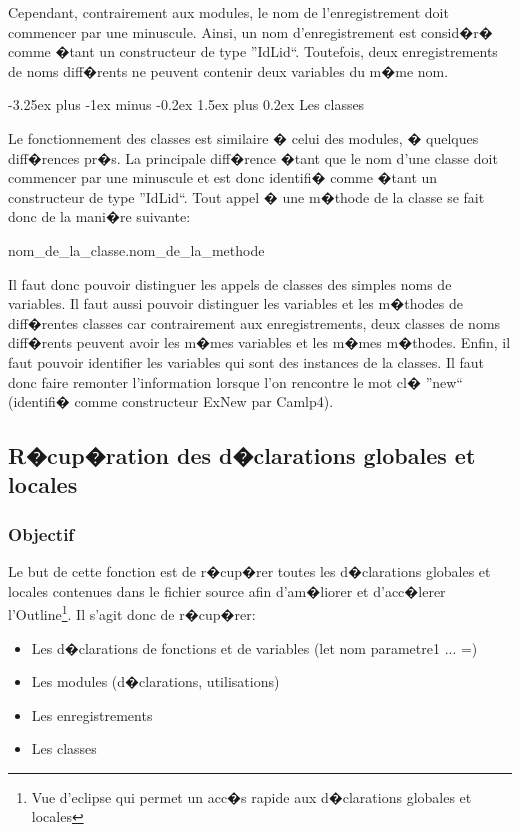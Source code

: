 \documentclass[a4paper,11pt,titlepage]{article}
\makeatletter
\renewcommand{\paragraph}{\@startsection{paragraph}{4}{0ex}%
   {-3.25ex plus -1ex minus -0.2ex}%
   {1.5ex plus 0.2ex}%
   {\normalfont\normalsize\bfseries}}
\makeatother
\begin{document}
Cependant, contrairement aux modules, le nom de l'enregistrement doit commencer par une minuscule. Ainsi, un nom d'enregistrement est consid�r� comme �tant un constructeur de type ''IdLid``. Toutefois, deux enregistrements de noms diff�rents ne peuvent contenir deux variables du m�me nom.

\paragraph{Les classes}

Le fonctionnement des classes est similaire � celui des modules, � quelques diff�rences pr�s. La principale diff�rence �tant que le nom d'une classe doit commencer par une minuscule et est donc identifi� comme �tant un constructeur de type ''IdLid``. Tout appel � une m�thode de la classe se fait donc de la mani�re suivante: \begin{center}
nom\_de\_la\_classe.nom\_de\_la\_methode\\                                                                            \end{center}

Il faut donc pouvoir distinguer les appels de classes des simples noms de variables. Il faut aussi pouvoir distinguer les variables et les m�thodes de diff�rentes classes car contrairement aux enregistrements, deux classes de noms diff�rents peuvent avoir les m�mes variables et les m�mes m�thodes. Enfin, il faut pouvoir identifier les variables qui sont des instances de la classes. Il faut donc faire remonter l'information lorsque l'on rencontre le mot cl� ''new`` (identifi� comme constructeur ExNew par Camlp4).
\newpage


\subsection{R�cup�ration des d�clarations globales et locales}

\subsubsection{Objectif}

Le but de cette fonction est de r�cup�rer toutes les d�clarations globales et locales contenues dans le fichier source afin d'am�liorer et d'acc�lerer l'Outline\footnote{Vue d'eclipse qui permet un acc�s rapide aux d�clarations globales et locales}.
Il s'agit donc de r�cup�rer:
\begin{itemize}
	\item Les d�clarations de fonctions et de variables (let nom parametre1 ... =)
	\item Les modules (d�clarations, utilisations)
	\item Les enregistrements
	\item Les classes
\end{itemize}
\end{document}
